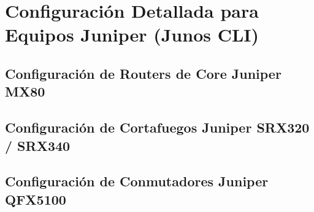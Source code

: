 \section{Configuración Detallada para Equipos Juniper (Junos CLI)}
\label{sec:configuracion_junos}

\subsection{Configuración de Routers de Core Juniper MX80}
\label{subsec:cfg_mx80}

\subsection{Configuración de Cortafuegos Juniper SRX320 / SRX340}
\label{subsec:cfg_srx}

\subsection{Configuración de Conmutadores Juniper QFX5100}
\label{subsec:cfg_qfx}
